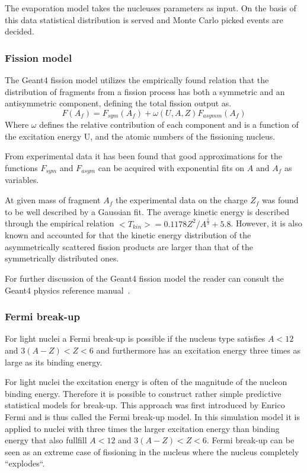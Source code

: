 The evaporation model takes the nucleuses parameters as input. On the basis of this data statistical distribution is served and Monte Carlo picked events are decided.

\subsubsection{Fission model}

The Geant4 fission model utilizes the empirically found relation that the distribution of fragments from a fission process has both a symmetric and an antisymmetric component, defining the total fission output as.
\begin{equation}
 F(A_f) = F_{sym}(A_f) + \omega(U,A,Z) F_{asymm}(A_f) 
\label{fissionSymmetricAsymmetric}
\end{equation}
Where $\omega$ defines the relative contribution of each component and is a function of the excitation energy U, and the atomic numbers of the fissioning nucleus.

From experimental data it has been found that good approximations for the functions $F_{sym}$ and $F_{asym}$ can be acquired with exponential fits on $A$ and $A_f$ as variables.

At given mass of fragment $A_f$ the experimental data on the charge $Z_f$ was found to be well described by a Gaussian fit. The average kinetic energy is described through the empirical relation $<T_{kin}>=0.1178Z^2/A^\frac{1}{3} + 5.8$. However, it is also known and accounted for that the kinetic energy distribution of the asymmetrically scattered fission products are larger than that of the symmetrically distributed ones. 

For further discussion of the Geant4 fission model the reader can consult the Geant4 physics reference manual~\cite[Chapter 31.]{physicsManual}.

\subsubsection{Fermi break-up}
For light nuclei a Fermi break-up is possible if the nucleus type satisfies $A < 12$ and $3(A - Z) < Z < 6$ and furthermore has an excitation energy three times as large as its binding energy.

For light nuclei the excitation energy is often of the magnitude of the nucleon binding energy. Therefore it is possible to construct rather simple predictive statistical models for break-up. This approach was first introduced by Enrico Fermi and is thus called the Fermi break-up model. In this simulation model it is applied to nuclei with three times the larger excitation energy than binding energy that also fullfill $A < 12$ and $3(A - Z) < Z < 6$. Fermi break-up can be seen as an extreme case of fissioning in the nucleus where the nucleus completely ``explodes``. %
\clearpage
